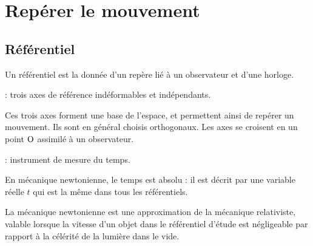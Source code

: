 \documentclass[12pt,fancy]{cours}
\begin{document}



\section{Repérer le mouvement}


\subsection{Référentiel}

 Un référentiel est la donnée d’un repère lié à un observateur et d'une horloge.

\begin{liste}
  \item {} : trois axes de référence indéformables et indépendants.
  
  Ces trois axes forment une base de l’espace, et permettent ainsi de repérer un mouvement. Ils sont en général choisis orthogonaux. Les axes se croisent en un point  $\rm O$ assimilé à un observateur.

  \item {} : instrument de mesure du temps.
  
  En mécanique newtonienne, le temps est absolu : il est décrit par une variable réelle $t$ qui est la même dans tous les référentiels. 
  
  \begin{remarque}
    La mécanique newtonienne est une approximation de la mécanique relativiste, valable lorsque la vitesse d’un objet dans le référentiel d'étude est négligeable par rapport à la célérité de la lumière dans le vide.
  \end{remarque}
  \end{liste}
\end{document}

